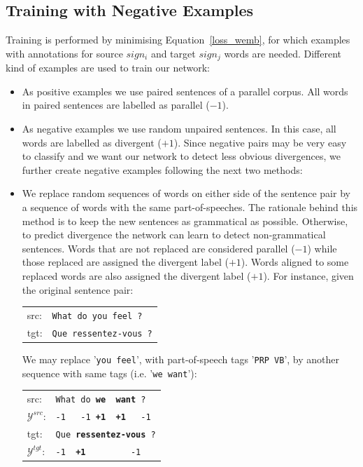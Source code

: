 \documentclass[11pt,a4paper]{article}
\begin{document}
\subsection{Training with Negative Examples}
\label{negative}

Training is performed by minimising Equation~\ref{loss_wemb}, for which examples with annotations for source $sign_i$ and target $sign_j$ words are needed.
Different kind of examples are used to train our network:
\begin{itemize}

\item As positive examples we use paired sentences of a parallel corpus. All words in paired sentences are labelled as parallel ($-1$). %
\item As negative examples we use random unpaired sentences. 
In this case, all words are labelled as divergent ($+1$). %
Since negative pairs may be very easy to classify and we want our network to detect less obvious divergences, we further create negative examples following the next two methods:

\item We replace random sequences of words on either side of the sentence pair by a sequence of words with the same part-of-speeches. 
The rationale behind this method is to keep the new sentences as grammatical as possible. 
Otherwise, to predict divergence the network can learn to detect non-grammatical sentences.
Words that are not replaced are considered parallel ($-1$) while those replaced are assigned the divergent label ($+1$). 
Words aligned to some replaced words are also assigned the divergent label ($+1$). For instance, given the original sentence pair:

\begin{table}[h]
\center
\begin{tabular}{ll}
src: & { \small \texttt{What do you feel ?}} \\
tgt: & { \small \texttt{Que ressentez-vous ?}} \\
\end{tabular}
\end{table}

We may replace '\texttt{you feel}', with part-of-speech tags '\texttt{PRP VB}', by another sequence with same tags (i.e. '\texttt{we want}'):

\begin{table}[h]
\center
\begin{tabular}{ll}
src: & { \small \texttt{What do {\bf we \ want} ?}} \\
$\mathcal{Y}^{src}$: & { \small \texttt{-1 \ \  -1 {\bf +1\ \ +1} \ \  -1}} \\
tgt: & { \small \texttt{Que {\bf ressentez-vous} ?}} \\
$\mathcal{Y}^{tgt}$: & { \small \texttt{-1\ \ {\bf +1}\ \ \ \ \ \ \ \ \ -1}} \\
\end{tabular}
\end{table}


\end{itemize}
\end{document}
